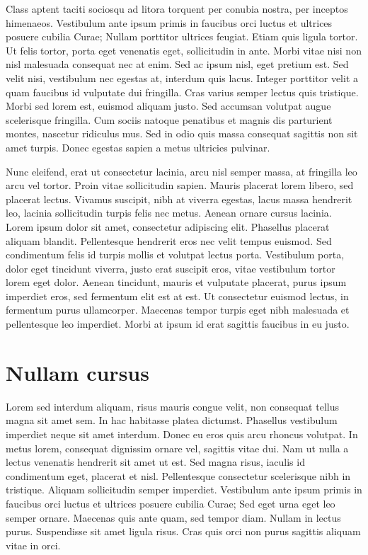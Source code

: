 \documentclass[11pt,a4paper,oneside]{book}
\begin{document}
Class aptent taciti sociosqu ad litora torquent per conubia nostra, per inceptos himenaeos. Vestibulum ante ipsum primis in faucibus orci luctus et ultrices
posuere cubilia Curae; Nullam porttitor ultrices feugiat. Etiam quis ligula tortor. Ut felis tortor, porta eget venenatis eget, sollicitudin in ante. Morbi
vitae nisi non nisl malesuada consequat nec at enim. Sed ac ipsum nisl, eget pretium est. Sed velit nisi, vestibulum nec egestas at, interdum quis lacus.
Integer porttitor velit a quam faucibus id vulputate dui fringilla. Cras varius semper lectus quis tristique. Morbi sed lorem est, euismod aliquam justo.
Sed accumsan volutpat augue scelerisque fringilla. Cum sociis natoque penatibus et magnis dis parturient montes, nascetur ridiculus mus. Sed in odio quis
massa consequat sagittis non sit amet turpis. Donec egestas sapien a metus ultricies pulvinar.

Nunc eleifend, erat ut consectetur lacinia, arcu nisl semper massa, at fringilla leo arcu vel tortor. Proin vitae sollicitudin sapien. Mauris placerat lorem libero,
sed placerat lectus. Vivamus suscipit, nibh at viverra egestas, lacus massa hendrerit leo, lacinia sollicitudin turpis felis nec metus. Aenean ornare cursus lacinia.
Lorem ipsum dolor sit amet, consectetur adipiscing elit. Phasellus placerat aliquam blandit. Pellentesque hendrerit eros nec velit tempus euismod. Sed condimentum
felis id turpis mollis et volutpat lectus porta. Vestibulum porta, dolor eget tincidunt viverra, justo erat suscipit eros, vitae vestibulum tortor lorem eget dolor.
Aenean tincidunt, mauris et vulputate placerat, purus ipsum imperdiet eros, sed fermentum elit est at est. Ut consectetur euismod lectus, in fermentum purus ullamcorper.
Maecenas tempor turpis eget nibh malesuada et pellentesque leo imperdiet. Morbi at ipsum id erat sagittis faucibus in eu justo.

\section{Nullam cursus}

Lorem sed interdum aliquam, risus mauris congue velit, non consequat tellus magna sit amet sem. In hac habitasse platea dictumst. Phasellus vestibulum
imperdiet neque sit amet interdum. Donec eu eros quis arcu rhoncus volutpat. In metus lorem, consequat dignissim ornare vel, sagittis vitae dui. Nam ut nulla a lectus
venenatis hendrerit sit amet ut est. Sed magna risus, iaculis id condimentum eget, placerat et nisl. Pellentesque consectetur scelerisque nibh in tristique.
Aliquam sollicitudin semper imperdiet. Vestibulum ante ipsum primis in faucibus orci luctus et ultrices posuere cubilia Curae; Sed eget urna eget leo semper ornare.
Maecenas quis ante quam, sed tempor diam. Nullam in lectus purus. Suspendisse sit amet ligula risus. Cras quis orci non purus sagittis aliquam vitae in orci.
\end{document}
